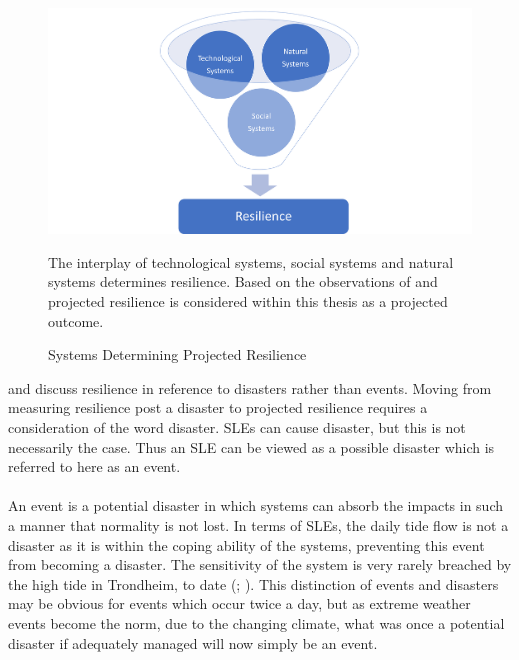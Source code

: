 \paragraph{}

\begin{figure}[!ht]
    \centering
    \includegraphics[width=1\textwidth]{fig_theory/resilience model - higher resilience .png}
    \caption{Systems Determining Projected Resilience}{The interplay of technological systems, social systems and natural systems determines resilience. Based on the observations of \cite{cutter_community_2020} and \cite{moser_turbulent_2019} projected resilience is considered within this thesis as a projected outcome.}
    \label{fig:projected_resilience}
\end{figure}

\cite{cutter_place-based_2008} and \cite{cutter_community_2020} discuss resilience in reference to disasters rather than events. Moving from measuring resilience post a disaster to projected resilience requires a consideration of the word disaster. SLEs can cause disaster, but this is not necessarily the case. Thus an SLE can be viewed as a possible disaster which is referred to here as an event. 
\paragraph{}
An event is a potential disaster in which systems can absorb the impacts in such a manner that normality is not lost. In terms of SLEs, the daily tide flow is not a disaster as it is within the coping ability of the systems, preventing this event from becoming a disaster. The sensitivity of the system is very rarely breached by the high tide in Trondheim, to date (\cite{kartverket_high_2022}; \cite{dsb_integrating-sea-level-rise-and-storm-surges--local-planningpdf_2017}). This distinction of events and disasters may be obvious for events which occur twice a day, but as extreme weather events become the norm, due to the changing climate, what was once a potential disaster if adequately managed will now simply be an event. 
